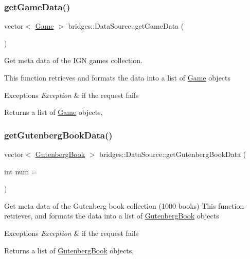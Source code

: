 \subsubsection{\texorpdfstring{get\+Game\+Data()}{getGameData()}}
{\footnotesize\ttfamily vector$<$ \mbox{\hyperlink{classbridges_1_1_game}{Game}} $>$ bridges\+::\+Data\+Source\+::get\+Game\+Data (\begin{DoxyParamCaption}{ }\end{DoxyParamCaption})}

Get meta data of the I\+GN games collection.

This function retrieves and formats the data into a list of \mbox{\hyperlink{classbridges_1_1_game}{Game}} objects


\begin{DoxyExceptions}{Exceptions}
{\em Exception} & if the request fails\\
\hline
\end{DoxyExceptions}
\begin{DoxyReturn}{Returns}
a list of \mbox{\hyperlink{classbridges_1_1_game}{Game}} objects, 
\end{DoxyReturn}
\mbox{\label{namespacebridges_1_1_data_source_a8146b00565286727e8206e377d9ff5bd}} 
\subsubsection{\texorpdfstring{get\+Gutenberg\+Book\+Data()}{getGutenbergBookData()}}
{\footnotesize\ttfamily vector$<$ \mbox{\hyperlink{classbridges_1_1_gutenberg_book}{Gutenberg\+Book}} $>$ bridges\+::\+Data\+Source\+::get\+Gutenberg\+Book\+Data (\begin{DoxyParamCaption}\item[{int}]{num = {} }\end{DoxyParamCaption})}

Get meta data of the Gutenberg book collection (1000 books) This function retrieves, and formats the data into a list of \mbox{\hyperlink{classbridges_1_1_gutenberg_book}{Gutenberg\+Book}} objects


\begin{DoxyExceptions}{Exceptions}
{\em Exception} & if the request fails\\
\hline
\end{DoxyExceptions}
\begin{DoxyReturn}{Returns}
a list of \mbox{\hyperlink{classbridges_1_1_gutenberg_book}{Gutenberg\+Book}} objects, 
\end{DoxyReturn}
\mbox{\label{namespacebridges_1_1_data_source_a2aa0d50a0b7bf8cc47c4f92dd1986dc6}} 
